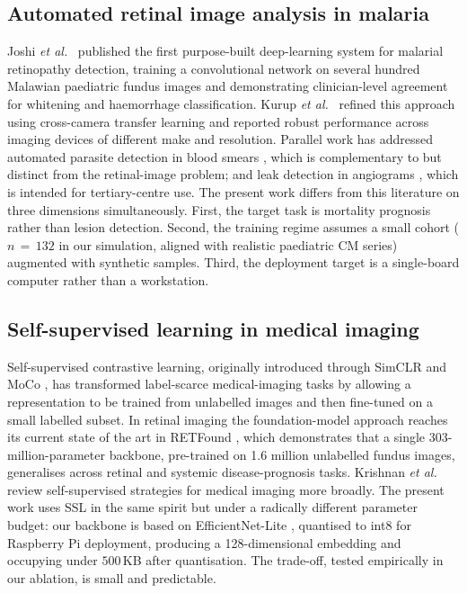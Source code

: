 \documentclass[twocolumn,10pt]{article}
\begin{document}
\subsection{Automated retinal image analysis in malaria}
Joshi \emph{et al.}\ \cite{Joshi2017} published the first
purpose-built deep-learning system for malarial retinopathy
detection, training a convolutional network on several hundred
Malawian paediatric fundus images and demonstrating
clinician-level agreement for whitening and haemorrhage
classification. Kurup \emph{et al.}\ \cite{Kurup2023} refined
this approach using cross-camera transfer learning and reported
robust performance across imaging devices of different make and
resolution. Parallel work has addressed automated parasite
detection in blood smears \cite{Rajaraman2019}, which is
complementary to but distinct from the retinal-image problem; and
leak detection in angiograms \cite{Zhao2015}, which is intended
for tertiary-centre use. The present work differs from this
literature on three dimensions simultaneously. First, the target
task is mortality prognosis rather than lesion detection. Second,
the training regime assumes a small cohort
($n\,=\,132$ in our simulation, aligned with realistic paediatric
CM series) augmented with synthetic samples. Third, the deployment
target is a single-board computer rather than a workstation.

\subsection{Self-supervised learning in medical imaging}
Self-supervised contrastive learning, originally introduced through
SimCLR \cite{Chen2020SimCLR} and MoCo \cite{He2020MoCo}, has
transformed label-scarce medical-imaging tasks by allowing a
representation to be trained from unlabelled images and then
fine-tuned on a small labelled subset. In retinal imaging the
foundation-model approach reaches its current state of the art in
RETFound \cite{Zhou2023RETFound}, which demonstrates that a
single 303-million-parameter backbone, pre-trained on 1.6 million
unlabelled fundus images, generalises across retinal and systemic
disease-prognosis tasks. Krishnan \emph{et al.}\
\cite{Krishnan2022SSL} review self-supervised strategies for
medical imaging more broadly. The present work uses SSL in the
same spirit but under a radically different parameter budget: our
backbone is based on EfficientNet-Lite \cite{Tan2019}, quantised
to int8 for Raspberry Pi deployment, producing a 128-dimensional
embedding and occupying under $500$\,KB after quantisation. The
trade-off, tested empirically in our ablation, is small and
predictable.
\end{document}

